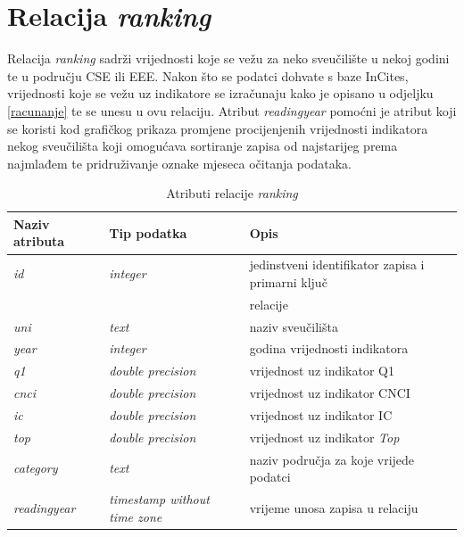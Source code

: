 \documentclass[times, utf8, zavrsni]{fer}
\begin{document}
           \section{Relacija \emph{ranking}}
           Relacija \emph{ranking} sadrži vrijednosti koje se vežu za neko sveučilište u nekoj godini te u području CSE ili EEE. 
           Nakon što se podatci dohvate s baze InCites, vrijednosti koje se vežu uz indikatore se izračunaju kako je opisano u odjeljku \ref{racunanje} 
           te se unesu u ovu relaciju. Atribut \emph{readingyear} pomoćni je atribut koji se koristi kod grafičkog prikaza promjene procijenjenih vrijednosti indikatora
           nekog sveučilišta koji omogućava sortiranje zapisa od najstarijeg prema najmlađem te pridruživanje oznake mjeseca očitanja podataka.
           \begin{table}[htb]
               \caption{Atributi relacije \emph{ranking}}
                   \label{tbl:ranking}
           
                   \begin{tabular}{lll} \hline
                   Naziv atributa & Tip podatka & Opis\\ \hline
                   \emph{id} &  \emph{integer} & jedinstveni identifikator zapisa i primarni ključ \\ &&relacije\\
                   \emph{uni} &  \emph{text} & naziv sveučilišta\\
                   \emph{year} &  \emph{integer} & godina vrijednosti indikatora\\
                   \emph{q1} &  \emph{double precision} & vrijednost uz indikator Q1\\
                   \emph{cnci} &  \emph{double precision} & vrijednost uz indikator CNCI\\
                   \emph{ic} &  \emph{double precision} & vrijednost uz indikator IC\\
                   \emph{top} &  \emph{double precision} & vrijednost uz indikator \emph{Top}\\
                   \emph{category} &  \emph{text} & naziv područja za koje vrijede podatci\\
                   \emph{readingyear} &  \emph{timestamp without time zone} & vrijeme unosa zapisa u relaciju\\
                   \end{tabular}
                   \end{table}    
                   \FloatBarrier 
\end{document}
